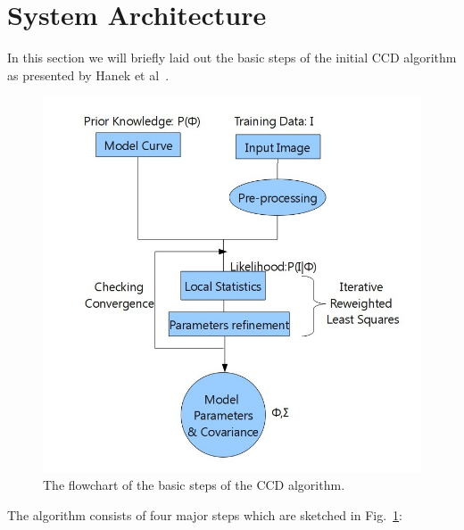 \documentclass[conference]{IEEEtran}
\begin{document}
\section{System Architecture}
\label{sec:arch}
In this section we will briefly laid out the basic steps of the initial
CCD algorithm as presented by Hanek et al~\cite{hanek2004contracting}.
\begin{figure}[htb]
  \centering
  \includegraphics[width=\columnwidth]{images/flowchart.jpg}
  \caption{The flowchart of the basic steps of the CCD algorithm.}
  \label{fig:flowchart}
\end{figure}
The algorithm consists of four major steps which are sketched in Fig.~\ref{fig:flowchart}:
\end{document}
